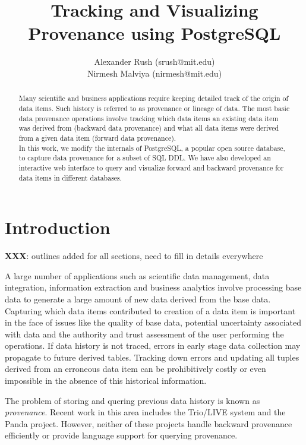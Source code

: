 \documentclass[11pt]{article}
\title{Tracking and Visualizing Provenance using PostgreSQL}
\author{Alexander Rush (srush@mit.edu)\\ Nirmesh Malviya (nirmesh@mit.edu)}
\begin{document}
\maketitle

\begin{abstract}
Many scientific and business applications require keeping detailed track of the origin of data items. Such history is referred to as provenance or lineage of data. The most basic data provenance operations involve tracking which data items an existing data item was derived from (backward data provenance) and what all data items were derived from a given data item (forward data provenance). \\

In this work, we modify the internals of PostgreSQL, a popular open source database, to capture data provenance for a subset of SQL DDL. We have also developed an interactive web interface to query and visualize forward and backward provenance for data items in different databases.
\end{abstract}

\section{Introduction}

\textbf{XXX}: outlines added for all sections, need to fill in details everywhere

A large number of applications such as scientific data management, data integration, information extraction and business analytics involve processing base data to generate a large amount of new data derived from the base data. Capturing which data items contributed to creation of a data item is important in the face of issues like the quality of base data, potential uncertainty associated with data and the authority and trust assessment of the user performing the operations. If data history is not traced, errors in early stage data collection may propagate to future derived tables. Tracking down errors and updating all tuples derived from an erroneous data item can be prohibitively costly or even impossible in the absence of this historical information.


The problem of storing and quering previous data history is known as \emph{provenance}. Recent work in this area includes the Trio/LIVE system and the Panda project. However, neither of these projects handle backward provenance efficiently or provide language support for querying provenance.
\end{document}
